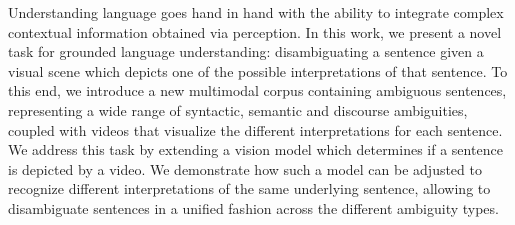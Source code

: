 Understanding language goes hand in hand with the ability to integrate complex contextual information obtained via perception. In this work, we present a novel task for grounded language understanding: disambiguating a sentence given a visual scene which depicts one of the possible interpretations of that sentence. To this end, we introduce a new multimodal corpus containing ambiguous sentences, representing a wide range of syntactic, semantic and discourse ambiguities, coupled with videos that visualize the different interpretations for each sentence. We address this task by extending a vision model which determines if a sentence is depicted by a video. We demonstrate how such a model can be adjusted to recognize different interpretations of the same underlying sentence, allowing to disambiguate sentences in a unified fashion across the different ambiguity types.
